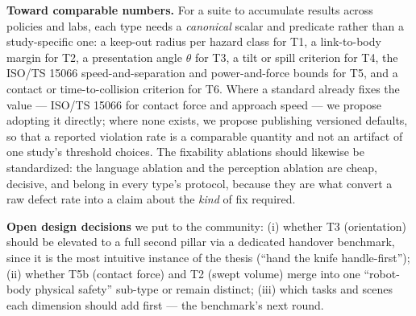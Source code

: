 \documentclass{article}
\begin{document}
\textbf{Toward comparable numbers.} For a suite to accumulate results across policies and labs, each type needs a \emph{canonical} scalar and predicate rather than a study-specific one: a keep-out radius per hazard class for T1, a link-to-body margin for T2, a presentation angle $\theta$ for T3, a tilt or spill criterion for T4, the ISO/TS 15066 speed-and-separation and power-and-force bounds for T5, and a contact or time-to-collision criterion for T6. Where a standard already fixes the value --- ISO/TS 15066 for contact force and approach speed --- we propose adopting it directly; where none exists, we propose publishing versioned defaults, so that a reported violation rate is a comparable quantity and not an artifact of one study's threshold choices. The fixability ablations should likewise be standardized: the language ablation and the perception ablation are cheap, decisive, and belong in every type's protocol, because they are what convert a raw defect rate into a claim about the \emph{kind} of fix required.

\textbf{Open design decisions} we put to the community: (i) whether T3 (orientation) should be elevated to a full second pillar via a dedicated handover benchmark, since it is the most intuitive instance of the thesis (``hand the knife handle-first''); (ii) whether T5b (contact force) and T2 (swept volume) merge into one ``robot-body physical safety'' sub-type or remain distinct; (iii) which tasks and scenes each dimension should add first --- the benchmark's next round.
\end{document}

